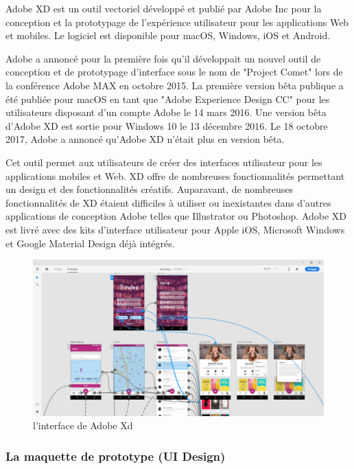 Adobe XD est un outil vectoriel développé et publié par Adobe Inc pour la conception et la prototypage de l'expérience utilisateur pour les applications Web et mobiles. Le logiciel est disponible pour macOS, Windows, iOS et Android.

Adobe a annoncé pour la première fois qu'il développait un nouvel outil de conception et de prototypage d'interface sous le nom de "Project Comet" lors de la conférence Adobe MAX en octobre 2015. La première version bêta publique a été publiée pour macOS en tant que "Adobe Experience Design CC" pour les utilisateurs disposant d'un compte Adobe le 14 mars 2016. Une version bêta d'Adobe XD est sortie pour Windows 10 le 13 décembre 2016. Le 18 octobre 2017, Adobe a annoncé qu'Adobe XD n'était plus en version bêta.

Cet outil permet aux utilisateurs de créer des interfaces utilisateur pour les applications mobiles et Web. XD offre de nombreuses fonctionnalités permettant un design et des fonctionnalités créatifs. Auparavant, de nombreuses fonctionnalités de XD étaient difficiles à utiliser ou inexistantes dans d’autres applications de conception Adobe telles que Illustrator ou Photoshop. Adobe XD est livré avec des kits d'interface utilisateur pour Apple iOS, Microsoft Windows et Google Material Design déjà intégrés.\cite{noauthor_adobe_2019}

\begin{figure}[H]
	\centering
		\includegraphics[width=14cm]{Images/chapter3/adobe_xd_interface.png}
		\caption{{\footnotesize l'interface de Adobe Xd}}
\end{figure}

\subsubsection{La maquette de prototype (UI Design)}

